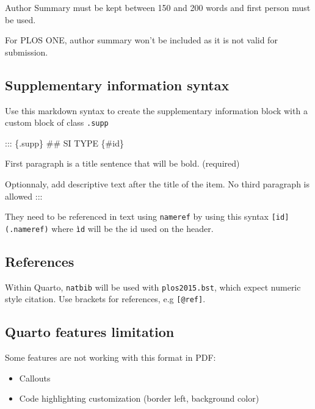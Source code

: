 \documentclass[
  10pt,
  letterpaper,
]{article}
\newenvironment{Shaded}{\begin{snugshade}}{\end{snugshade}}
\newcommand{\FunctionTok}[1]{\textcolor[rgb]{0.28,0.35,0.67}{#1}}
\newcommand{\NormalTok}[1]{\textcolor[rgb]{0.00,0.23,0.31}{#1}}
\providecommand{\tightlist}{%
  \setlength{\itemsep}{0pt}\setlength{\parskip}{0pt}}\usepackage{longtable,booktabs,array}
\begin{document}
Author Summary must be kept between 150 and 200 words and first person
must be used.

For PLOS ONE, author summary won't be included as it is not valid for
submission.

\hypertarget{supplementary-information-syntax}{%
\subsection{Supplementary information
syntax}\label{supplementary-information-syntax}}

Use this markdown syntax to create the supplementary information block
with a custom block of class \texttt{.supp}

\begin{Shaded}
\begin{Highlighting}[]
\NormalTok{::: \{.supp\}}
\FunctionTok{\#\# SI TYPE \{\#id\}}

\NormalTok{First paragraph is a title sentence that will be bold. (required)}

\NormalTok{Optionnaly, add descriptive text after the title of the}
\NormalTok{item. No third paragraph is allowed}
\NormalTok{:::}
\end{Highlighting}
\end{Shaded}

They need to be referenced in text using \texttt{nameref} by using this
syntax \texttt{{[}id{]}(.nameref)} where \texttt{ìd} will be the id used
on the header.

\hypertarget{references}{%
\subsection{References}\label{references}}

Within Quarto, \texttt{natbib} will be used with \texttt{plos2015.bst},
which expect numeric style citation. Use brackets for references, e.g
\texttt{{[}@ref{]}}.

\hypertarget{quarto-features-limitation}{%
\subsection{Quarto features
limitation}\label{quarto-features-limitation}}

Some features are not working with this format in PDF:

\begin{itemize}
\tightlist
\item
  Callouts
\item
  Code highlighting customization (border left, background color)
\end{itemize}
\end{document}
